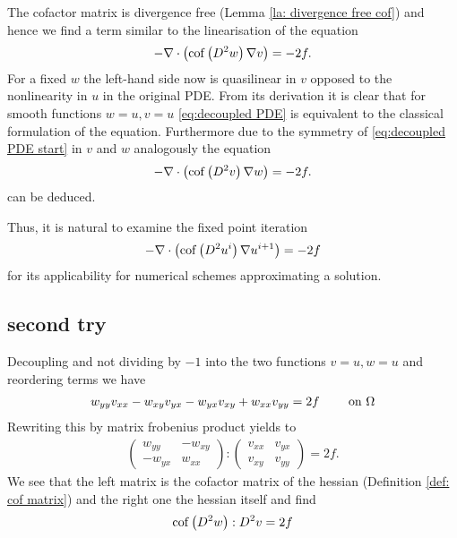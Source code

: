 The cofactor matrix is divergence free (Lemma \ref{la: divergence free cof}) and hence we find a term similar to the linearisation of the \MA equation
\begin{align}
	- \nabla \cdot \left( \operatorname{cof} \left(  D^2 w \right) \nabla v \right)  = -2f.  \label{eq:decoupled PDE}
\end{align}
For a fixed $w$ the left-hand side now is quasilinear in $v$ opposed to the nonlinearity in $u$ in the original PDE. From its derivation it is clear that for smooth functions $w=u, v=u$ \eqref{eq:decoupled PDE} is equivalent to the classical formulation of the \MA equation. Furthermore due to the symmetry of \eqref{eq:decoupled PDE start} in $v$ and $w$ analogously the equation 
\begin{align}
	- \nabla \cdot \left( \operatorname{cof} \left(  D^2 v \right) \nabla w \right)  = -2f.  \label{eq:decoupled PDE2}
\end{align}
can be deduced.

Thus, it is natural to examine the fixed point iteration
\begin{align}
	- \nabla \cdot \left( \operatorname{cof} \left(  D^2 u^i \right) \nabla u^{i+1} \right)  = -2f  \label{eq:decoupled PDE}
\end{align}
for its applicability for numerical schemes approximating a \MA solution.

\subsection*{second try}
Decoupling and not dividing by $-1 $ into the two functions $v = u ,w = u$ and reordering terms we have
\begin{align}
	w_{yy} v_{xx}- w_{xy} v_{yx} - w_{yx} v_{xy} +w_{xx} v_{yy} = 2f \qquad \textnormal{ on } \Omega
\end{align}
Rewriting this by matrix frobenius product yields to
\begin{align}
 \begin{pmatrix} w_{yy} & -w_{xy}  \\ -w_{yx} & w_{xx} \end{pmatrix}: \begin{pmatrix} v_{xx} & v_{yx}  \\  v_{xy} & v_{yy} \end{pmatrix} = 2f.
\end{align}
We see that the left matrix is the cofactor matrix of the hessian (Definition \ref{def: cof matrix}) and the right one the hessian itself and find
\begin{align}
		\operatorname{cof} \left( D^2 w  \right):D^2 v  = 2f  \label{eq:short formula}
\end{align}

